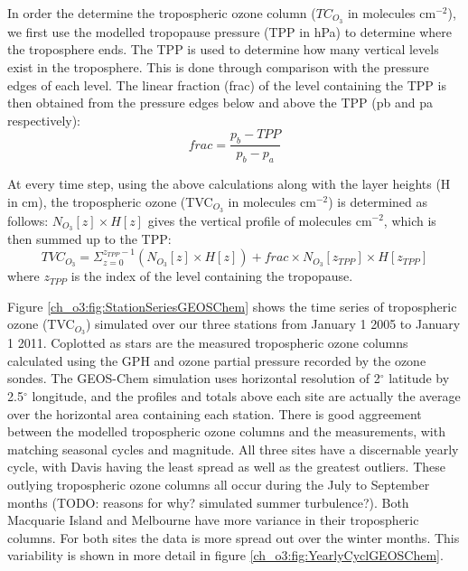     In order the determine the tropospheric ozone column ($TC_{O_3}$ in molecules cm$^{-2}$), we first use the modelled tropopause pressure (TPP in hPa) to determine where the troposphere ends.
    The TPP is used to determine how many vertical levels exist in the troposphere.
    This is done through comparison with the pressure edges of each level.
    The linear fraction (frac) of the level containing the TPP is then obtained from the pressure edges below and above the TPP (pb and pa respectively):
    \begin{equation*}
     frac = \frac{p_b - TPP}{p_b-p_a}
    \end{equation*}
    
    At every time step, using the above calculations along with the layer heights (H in cm), the tropospheric ozone (TVC$_{O_3}$ in molecules cm$^{-2}$) is determined as follows: $N_{O_3}[z] \times H[z]$ gives the vertical profile of molecules cm$^{-2}$, which is then summed up to the TPP:
    \begin{equation*}
     TVC_{O_3} = \Sigma_{z=0}^{z_{TPP}-1} \left( N_{O_3}[z] \times H[z] \right) + frac \times N_{O_3}[z_{TPP}] \times H[z_{TPP}]
    \end{equation*}
    where $z_{TPP}$ is the index of the level containing the tropopause.
    
    Figure \ref{ch_o3:fig:StationSeriesGEOSChem} shows the time series of tropospheric ozone (TVC$_{O_3}$) simulated over our three stations from January 1 2005 to January 1 2011.
    Coplotted as stars are the measured tropospheric ozone columns calculated using the GPH and ozone partial pressure recorded by the ozone sondes.
    The GEOS-Chem simulation uses horizontal resolution of 2$^{\circ}$ latitude by 2.5$^{\circ}$ longitude, and the profiles and totals above each site are actually the average over the horizontal area containing each station.
    There is good aggreement between the modelled tropospheric ozone columns and the measurements, with matching seasonal cycles and magnitude.
    All three sites have a discernable yearly cycle, with Davis having the least spread as well as the greatest outliers.
    These outlying tropospheric ozone columns all occur during the July to September months (TODO: reasons for why? simulated summer turbulence?).
    Both Macquarie Island and Melbourne have more variance in their tropospheric columns.
    For both sites the data is more spread out over the winter months.
    This variability is shown in more detail in figure \ref{ch_o3:fig:YearlyCyclGEOSChem}.
    
